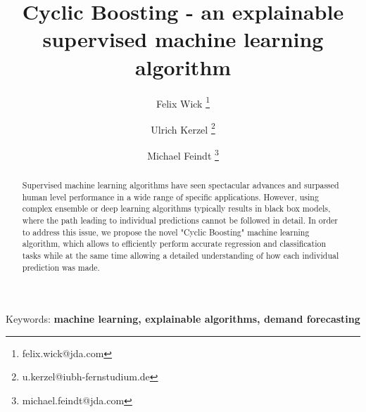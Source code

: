\documentclass[BCOR=1mm, DIV=calc,10pt,
twoside=true,
twocolumn,
headings=normal]{scrartcl}
\begin{document}
\title{Cyclic Boosting - an explainable supervised machine learning algorithm}


\author[1]{Felix Wick \thanks{felix.wick@jda.com}}
\author[2]{Ulrich Kerzel \thanks{u.kerzel@iubh-fernstudium.de}}
\author[1]{Michael Feindt \thanks{michael.feindt@jda.com}}


\date{}

\maketitle


\begin{abstract}
Supervised machine learning algorithms have seen spectacular advances and surpassed human
level performance in a wide range of specific applications. However, using complex
ensemble or deep learning algorithms typically results in black box models, where the path
leading to individual predictions cannot be followed in detail. In order to address this
issue, we propose the novel "Cyclic Boosting" machine learning algorithm, which allows to
efficiently perform accurate regression and classification tasks while at the same time
allowing a detailed understanding of how each individual prediction was made.
\end{abstract}

{Keywords: \textbf{machine learning, explainable algorithms, demand forecasting}}
\end{document}
